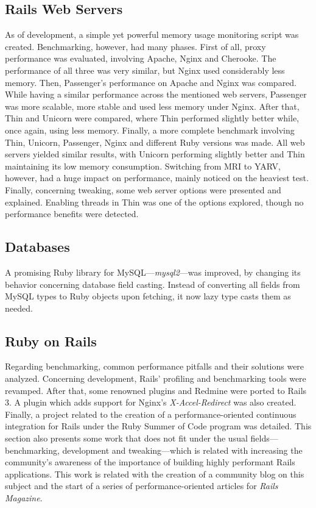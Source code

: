 \documentclass[9pt,a4paper]{extarticle}
\begin{document}
\begin{multicols}{2}
\subsection{Rails Web Servers}
As of development, a simple yet powerful memory usage monitoring script was created. Benchmarking, however, had many phases. First of all, proxy performance was evaluated, involving Apache, Nginx and Cherooke. The performance of all three was very similar, but Nginx used considerably less memory. Then, Passenger's performance on Apache and Nginx was compared. While having a similar performance across the mentioned web servers, Passenger was more scalable, more stable and used less memory under Nginx. After that, Thin and Unicorn were compared, where Thin performed slightly better while, once again, using less memory. Finally, a more complete benchmark involving Thin, Unicorn, Passenger, Nginx and different Ruby versions was made. All web servers yielded similar results, with Unicorn performing slightly better and Thin maintaining its low memory consumption. Switching from MRI to YARV, however, had a huge impact on performance, mainly noticed on the heaviest test. Finally, concerning tweaking, some web server options were presented and explained. Enabling threads in Thin was one of the options explored, though no performance benefits were detected.


\subsection{Databases}
A promising Ruby library for MySQL---\textit{mysql2}---was improved, by changing its behavior concerning database field casting. Instead of converting all fields from MySQL types to Ruby objects upon fetching, it now lazy type casts them as needed.


\subsection{Ruby on Rails}
Regarding benchmarking, common performance pitfalls and their solutions were analyzed. Concerning development, Rails' profiling and benchmarking tools were revamped. After that, some renowned plugins and Redmine were ported to Rails 3. A plugin which adds support for Nginx's \textit{X-Accel-Redirect} was also created. Finally, a project related to the creation of a performance-oriented continuous integration for Rails under the Ruby Summer of Code program was detailed. This section also presents some work that does not fit under the usual fields---benchmarking, development and tweaking---which is related with increasing the community's awareness of the importance of building highly performant Rails applications. This work is related with the creation of a community blog on this subject and the start of a series of performance-oriented articles for \textit{Rails Magazine}. 



\end{multicols}
\end{document}
